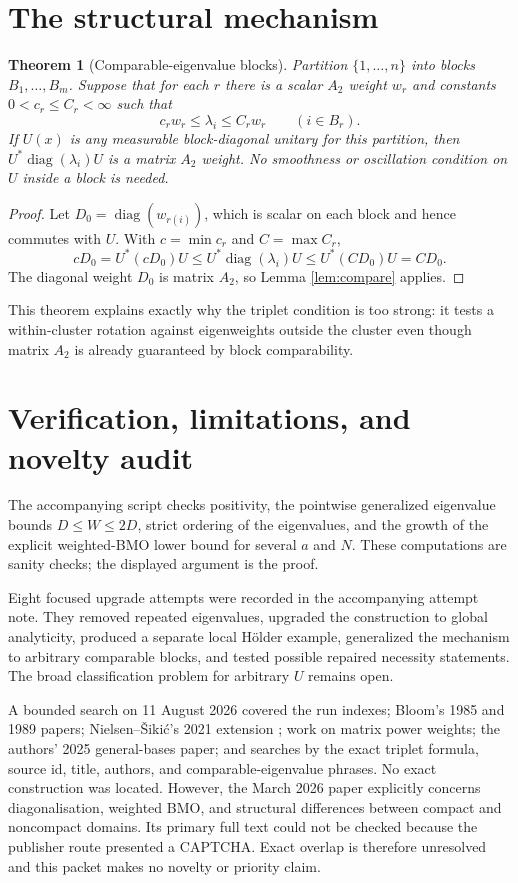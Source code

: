 \documentclass[10pt]{article}
\newtheorem{theorem}{Theorem}
\newcommand{\diag}{\operatorname{diag}}
\begin{document}
\section{The structural mechanism}

\begin{theorem}[Comparable-eigenvalue blocks]\label{thm:block}
Partition $\{1,\ldots,n\}$ into blocks $B_1,\ldots,B_m$.  Suppose that for
each $r$ there is a scalar $A_2$ weight $w_r$ and constants
$0<c_r\le C_r<\infty$ such that
\[
 c_rw_r\le\lambda_i\le C_rw_r\qquad(i\in B_r).
\]
If $U(x)$ is any measurable block-diagonal unitary for this partition, then
$U^*\diag(\lambda_i)U$ is a matrix $A_2$ weight.  No smoothness or oscillation
condition on $U$ inside a block is needed.
\end{theorem}

\begin{proof}
Let $D_0=\diag(w_{r(i)})$, which is scalar on each block and hence commutes
with $U$.  With $c=\min c_r$ and $C=\max C_r$,
\[
 cD_0=U^*(cD_0)U\le U^*\diag(\lambda_i)U
 \le U^*(CD_0)U=CD_0.
\]
The diagonal weight $D_0$ is matrix $A_2$, so Lemma \ref{lem:compare} applies.
\end{proof}

This theorem explains exactly why the triplet condition is too strong: it
tests a within-cluster rotation against eigenweights outside the cluster even
though matrix $A_2$ is already guaranteed by block comparability.

\section{Verification, limitations, and novelty audit}

The accompanying script checks positivity, the pointwise generalized
eigenvalue bounds $D\le W\le2D$, strict ordering of the eigenvalues, and the
growth of the explicit weighted-BMO lower bound for several $a$ and $N$.
These computations are sanity checks; the displayed argument is the proof.

Eight focused upgrade attempts were recorded in the accompanying attempt
note.  They removed repeated eigenvalues, upgraded the construction to global
analyticity, produced a separate local Hölder example, generalized the
mechanism to arbitrary comparable blocks, and tested possible repaired
necessity statements.  The broad classification problem for arbitrary $U$
remains open.

A bounded search on 11 August 2026 covered the run indexes; Bloom's 1985 and
1989 papers; Nielsen--Šikić's 2021 extension \cite{NielsenSikic2021}; work on
matrix power weights; the authors' 2025 general-bases paper; and searches by
the exact triplet formula, source id, title, authors, and comparable-eigenvalue
phrases.  No exact construction was located.  However, the March 2026 paper
\cite{NielsenSikic2026} explicitly concerns diagonalisation, weighted BMO, and
structural differences between compact and noncompact domains.  Its primary
full text could not be checked because the publisher route presented a
CAPTCHA.  Exact overlap is therefore unresolved and this packet makes no
novelty or priority claim.
\end{document}
